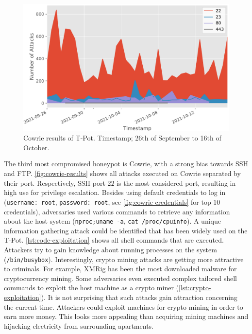 \begin{figure}[ht]
    \centering
    \includegraphics[width=\textwidth]{figures/tpot-cowrie-port.pdf}
    \caption[Cowrie results of T-Pot]{
        Cowrie results of T-Pot.
        Timestamp; 26th of September to 16th of October.
    }
    \label{fig:cowrie-results}
\end{figure}

The third most compromised honeypot is Cowrie, with a strong bias towards SSH and FTP.
\autoref{fig:cowrie-results} shows all attacks executed on Cowrie separated by their port.
Respectively, SSH port $22$ is the most considered port, resulting in high use for privilege escalation.
Besides using default credentials to log in (\verb|username: root|, \verb|password: root|, see \autoref{fig:cowrie-credentials} for top 10 credentials), adversaries used various commands to retrieve any information about the host system (\verb|nproc;uname -a|, \verb|cat /proc/cpuinfo|).
A unique information gathering attack could be identified that has been widely used on the T-Pot.
\autoref{lst:code-exploitation} shows all shell commands that are executed.
Attackers try to gain knowledge about running processes on the system (\verb|/bin/busybox|).
Interestingly, crypto mining attacks are getting more attractive to criminals.
For example, XMRig has been the most downloaded malware for cryptocurrency mining.
Some adversaries even executed complex tailored shell commands to exploit the host machine as a crypto miner (\autoref{lst:crypto-exploitation}).
It is not surprising that such attacks gain attraction concerning the current time.
Attackers could exploit machines for crypto mining in order to earn more money.
This looks more appealing than acquiring mining machines and hijacking electricity from surrounding apartments.

